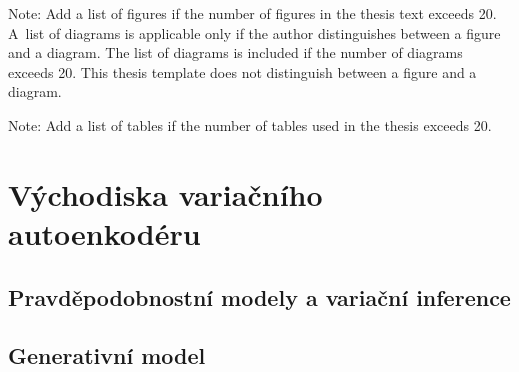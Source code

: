 \documentclass[11pt,a4paper]{report}
\let\openright=\clearpage
\begin{document}


\setcounter{tocdepth}{2}
\tableofcontents

\openright
\listoffigures
Note: Add a list of figures if the number of figures in the thesis text exceeds 20. A~list of diagrams is applicable only if the author distinguishes between a figure and a diagram. The list of diagrams is included if the number of diagrams exceeds 20. This thesis template does not distinguish between a figure and a diagram.

\clearpage
\listoftables
Note: Add a list of tables if the number of tables used in the thesis exceeds 20. 



\pagestyle{fancyx}
{%
\pagestyle{plain}

}

\chapter{Východiska variačního autoenkodéru}








\section{Pravděpodobnostní modely a variační inference}
\label{sec:probabilistic_models_variational_inference}
\section{Generativní model}
\label{sec:generative_model}
\end{document}
